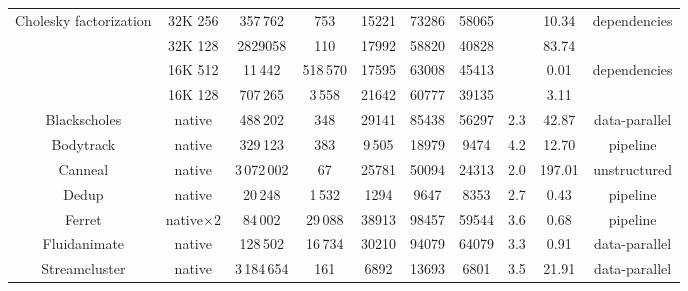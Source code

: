 \begin{table}[t]
\begin{center}
{\begin{tabular}{|c|c|c|c|c|c|c|c|c|c|}
				\multirow{2}{*}{\parbox{18mm}{\centering Cholesky factorization}} & 
				32K 256 & 357\,762  & 753 & 15221 &  73286 &  58065 &  \multirow{2}{*}{\parbox{9mm}{}} & 10.34 & \multirow{2}{*}{\parbox{17mm}{\centering dependencies}}\\                                              & 32K 128 & 2829058 & 110 & 17992 &  58820 &  40828 & & 83.74 &\\
				\hline{}
				\multirow{2}{*}{\parbox{18mm}{\centering QR factorization}} & 16K 512 & 11\,442 & 518\,570  & 17595 & 63008 &   45413 & \multirow{2}{*}{\parbox{9mm}{}} & 0.01 &\multirow{2}{*}{\parbox{17mm}{\centering dependencies}}\\
				&  16K 128 & 707\,265 & 3\,558 & 21642 & 60777 & 39135 & & 3.11 &\\
				\hline
				Blackscholes & native & 488\,202 & 348  &   29141  &  85438 &  56297 & 2.3 & 42.87 & data-parallel \\
				\hline
				Bodytrack & native & 329\,123 & 383 &  9\,505 &  18979 & 9474 & 4.2 & 12.70 & pipeline \\ 
				\hline
				Canneal & native & 3\,072\,002 & 67 & 25781 & 50094 &  24313 & 2.0 & 197.01 & unstructured \\
				\hline
				Dedup & native & 20\,248 & 1\,532 & 1294 & 9647 &  8353 & 2.7 & 0.43 & pipeline \\
				\hline 
				Ferret & native$\times$2 & 84\,002 & 29\,088 & 38913 & 98457 &  59544 & 3.6 & 0.68 & pipeline \\
				\hline
				Fluidanimate & native & 128\,502 & 16\,734 & 30210 & 94079 &  64079 & 3.3 & 0.91 & data-parallel \\
				\hline
				Streamcluster & native & 3\,184\,654 & 161 & 6892 & 13693 &  6801 & 3.5 & 21.91 & data-parallel \\
				\hline
		\end{tabular}}
	\end{center}
	\vspace{-0.4cm}
\end{table}

